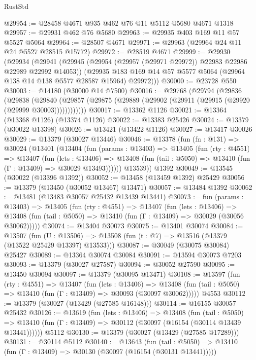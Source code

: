 \begin{lexlean}{RustStd}
\begin{coremodule}
@29954 := @28458 @4671 @935 @462 @76 @11 @5112 @5680 @4671 @1318
@29957 := @29931 @462 @76 @5680
@29963 := @29935 @403 @169 @11 @57 @5527 @5064
@29964 := @28507 @4671
@29971 := @29963 (@29964 @24 @11 @24 @5527 @28515 @15772)
@29972 := @28519 @4671
@29999 := @29930
    (@29934
      (@29941
        (@29945 (@29954 (@29957 (@29971 @29972)) @22983 @22986 @22989 @22992 @14053))
        (@29935 @183 @169 @14 @57 @5577 @5064 (@29964 @138 @14 @138 @5577 @28587 @15964) @29972)))
@30000 := @23728 @550
@30003 := @14180 (@30000 @14 @7500)
@30016 := @29768
    (@29794
      (@29836
        (@29838
          (@29840 (@29857 (@29875 (@29889 (@29902 (@29911 (@29915 (@29920 (@29999 @30003))))))))))))
@30017 := @13362 @1126
@30021 := @13364 (@13368 @1126) (@13374 @1126)
@30022 := @13383 @25426
@30024 := @13379 (@30022 @13398)
@30026 := @13421 (@13422 @1126)
@30027 := @13417 @30026
@30029 := @13379 (@30027 @13446)
@30046 := @13378
    (fun (fn : @131) =>
    @30024
      (@13401
        (@13404
          (fun (params : @13403) =>
          @13405
            (fun (rty : @4551) =>
            @13407
              (fun (lets : @13406) =>
              @13408 (fun (tail : @5050) => @13410 (fun (Γ : @13409) => @30029 @13493))))))
        @13539))
    @1392
@30049 := @13545 (@30022 (@13396 @1392))
@30052 := @13458 (@13459 @1392) @25429
@30056 := @13379 (@13450 (@30052 @13467) @13471)
@30057 := @13484 @1392
@30062 := @13481 (@13483 @30057 @25432 @13439 @13441)
@30073 := fun (params : @13403) =>
  @13405
    (fun (rty : @4551) =>
    @13407
      (fun (lets : @13406) =>
      @13408 (fun (tail : @5050) => @13410 (fun (Γ : @13409) => @30029 (@30056 @30062)))))
@30074 := @13404 @30073
@30075 := @13401 @30074
@30084 := @13507
    (fun (U : @13506) => @13508 (fun (t : @7) => @13516 (@13379 (@13522 @25429 @13397) @13533)))
@30087 := @30049 (@30075 @30084) @25427
@30089 := @13364 @30074 @30084
@30091 := @13594 @30073 @7203
@30093 := @13379 (@30027 @27587)
@30094 := @30052 @27590
@30095 := @13450 @30094
@30097 := @13379 (@30095 @13471)
@30108 := @13597
    (fun (rty : @4551) =>
    @13407
      (fun (lets : @13406) =>
      @13408 (fun (tail : @5050) => @13410 (fun (Γ : @13409) => @30093 (@30097 @30062)))))
    @4553
@30112 := @13379 (@30027 (@13429 (@27585 @16148)))
@30114 := @16155 @30057 @25432
@30126 := @13619
    (fun (lets : @13406) =>
    @13408
      (fun (tail : @5050) =>
      @13410 (fun (Γ : @13409) => @30112 (@30097 (@16154 (@30114 @13439 @13441))))))
    @5112
@30130 := @13379 (@30027 (@13429 (@27585 @17289)))
@30131 := @30114 @5112
@30140 := @13643
    (fun (tail : @5050) => @13410 (fun (Γ : @13409) => @30130 (@30097 (@16154 (@30131 @13441)))))

\end{coremodule}
\end{lexlean}
